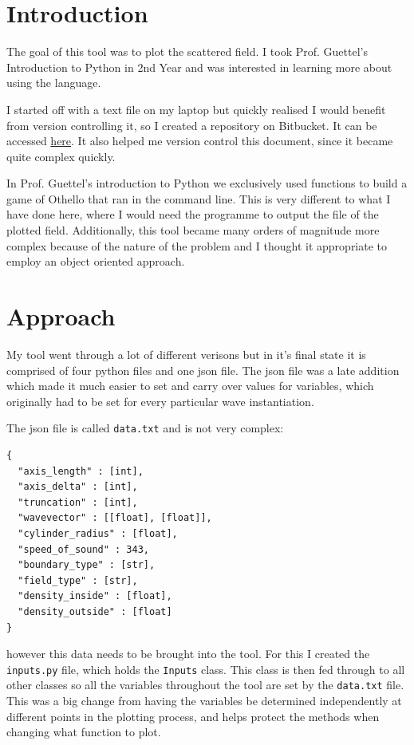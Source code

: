 %
\section{Introduction}
%
The goal of this tool was to plot the scattered field. I took Prof. Guettel's Introduction to Python in 2nd Year and was interested in learning more about using the language.

I started off with a text file on my laptop but quickly realised I would benefit from version controlling it, so I created a repository on Bitbucket. It can be accessed \href{https://bitbucket.org/veracruz/canonical_scattering}{here}. It also helped me version control this document, since it became quite complex quickly.

In Prof. Guettel's introduction to Python we exclusively used functions to build a game of Othello that ran in the command line. This is very different to what I have done here, where I would need the programme to output the file of the plotted field. Additionally, this tool became many orders of magnitude more complex because of the nature of the problem and I thought it appropriate to employ an object oriented approach.

\section{Approach}

My tool went through a lot of different verisons but in it's final state it is comprised of four python files and one json file. The json file was a late addition which made it much easier to set and carry over values for variables, which originally had to be set for every particular wave instantiation.

The json file is called \verb!data.txt! and is not very complex:
\begin{lstlisting}
{
  "axis_length" : [int],
  "axis_delta" : [int],
  "truncation" : [int],
  "wavevector" : [[float], [float]],
  "cylinder_radius" : [float],
  "speed_of_sound" : 343,
  "boundary_type" : [str],
  "field_type" : [str],
  "density_inside" : [float],
  "density_outside" : [float]
} \end{lstlisting}
however this data needs to be brought into the tool. For this I created the \verb!inputs.py! file, which holds the \verb!Inputs! class. This class is then fed through to all other classes so all the variables throughout the tool are set by the \verb!data.txt! file. This was a big change from having the variables be determined independently at different points in the plotting process, and helps protect the methods when changing what function to plot.

